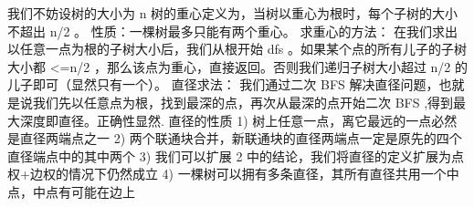 {}
\markdownRendererSectionEnd \markdownRendererSectionBegin
{}\markdownRendererInterblockSeparator
{}\markdownRendererSectionBegin
{}\markdownRendererInterblockSeparator
{}我们不妨设树的大小为\markdownRendererDollarSign{} n \markdownRendererDollarSign{}\markdownRendererParagraphSeparator
{}树的重心定义为，当树以重心为根时，每个子树的大小不超出\markdownRendererDollarSign{} n/2 \markdownRendererDollarSign{}。\markdownRendererParagraphSeparator
{}性质：一棵树最多只能有两个重心。\markdownRendererParagraphSeparator
{}求重心的方法：\markdownRendererParagraphSeparator
{}在我们求出以任意一点为根的子树大小后，我们从根开始\markdownRendererDollarSign{} dfs \markdownRendererDollarSign{}。如果某个点的所有儿子的子树大小都\markdownRendererDollarSign{} <=n/2 \markdownRendererDollarSign{}，那么该点为重心，直接返回。否则我们递归子树大小超过\markdownRendererDollarSign{} n/2 \markdownRendererDollarSign{}的儿子即可（显然只有一个）。\markdownRendererInterblockSeparator
{}\markdownRendererInterblockSeparator
{}
\markdownRendererSectionEnd \markdownRendererSectionBegin
{}\markdownRendererInterblockSeparator
{}直径求法：\markdownRendererParagraphSeparator
{}我们通过二次\markdownRendererDollarSign{} BFS \markdownRendererDollarSign{}解决直径问题，也就是说我们先以任意点为根，找到最深的点，再次从最深的点开始二次\markdownRendererDollarSign{} BFS\markdownRendererSoftLineBreak
{}\markdownRendererDollarSign{},得到最大深度即直径。正确性显然.\markdownRendererInterblockSeparator
{}\markdownRendererInterblockSeparator
{}直径的性质\markdownRendererParagraphSeparator
{}\markdownRendererDollarSign{} 1) \markdownRendererDollarSign{}树上任意一点，离它最远的一点必然是直径两端点之一\markdownRendererParagraphSeparator
{}\markdownRendererDollarSign{} 2) \markdownRendererDollarSign{}两个联通块合并，新联通块的直径两端点一定是原先的四个直径端点中的其中两个\markdownRendererParagraphSeparator
{}\markdownRendererDollarSign{} 3) \markdownRendererDollarSign{}我们可以扩展\markdownRendererDollarSign{} 2 \markdownRendererDollarSign{}中的结论，我们将直径的定义扩展为点权+边权的情况下仍然成立\markdownRendererParagraphSeparator
{}\markdownRendererDollarSign{} 4) \markdownRendererDollarSign{}一棵树可以拥有多条直径，其所有直径共用一个中点，中点有可能在边上\markdownRendererInterblockSeparator
{}
\markdownRendererSectionEnd \markdownRendererSectionBegin
